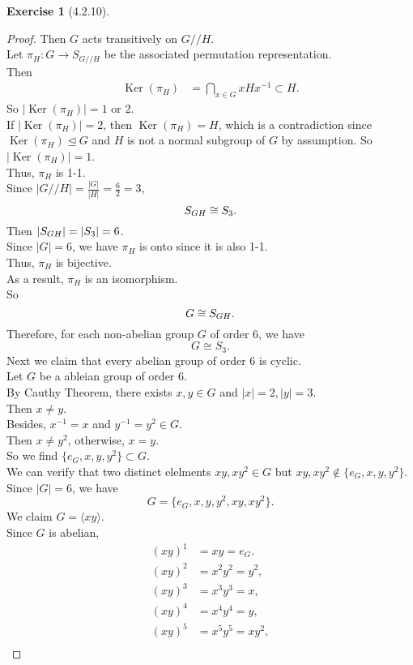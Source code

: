 \documentclass{amsart}
\renewcommand{\ker}{\operatorname{Ker}}
\theoremstyle{plain}
\theoremstyle{definition}
\newtheorem{exer}[lem]{Exercise}
\begin{document}
\begin{exer}[4.2.10]
\begin{proof}
Then $G$ acts transitively on $G//H$. \\
Let $\pi_H: G \to S_{G//H}$ be the associated permutation representation.\\
Then
\begin{align*}
	\ker(\pi_H) &= \bigcap_{x\in G}xHx^{-1} \subset  H.
\end{align*}
So $|\ker(\pi_H)| = 1$ or $2$.\\
If $|\ker(\pi_H)| =2$, then $\ker(\pi_H) = H$, which is a contradiction since $\ker(\pi_H) \unlhd G$ and $H$ is not a normal subgroup of $G$ by assumption.
So $|\ker(\pi_H)| = 1$.\\
Thus, $\pi_H$ is 1-1.\\
Since $\left|G//H\right| = \frac{|G|}{|H|} = \frac{6}{2} = 3$,\\
\[ S_{G\\H} \cong S_3. \]
Then $|S_{G\\H}| = |S_3| = 6$.\\
Since $|G| = 6$, we have $\pi_H$ is onto since it is also 1-1.\\
Thus, $\pi_H$ is bijective.\\
As a result, $\pi_H$ is an isomorphism.\\
So 
\[G \cong S_{G\\H}.\]
Therefore, for each non-abelian group $G$ of order 6, we have
\[G \cong S_3. \]
Next we claim that every abelian group of order 6 is cyclic.\\
Let $G$ be a ableian group of order 6.\\
By Cauthy Theorem, there exists $x,y \in G$ and $|x| = 2, |y|= 3$.\\
Then $x \neq y$.\\
Besides, $x^{-1} = x$ and $y^{-1} = y^2 \in G$.\\
Then $x \neq y^2$, otherwise, $x=y$.\\
So we find $\{e_G,x,y,y^2\} \subset G$.\\
We can verify that two distinct elelments $xy,xy^2 \in G$ but $xy,xy^2 \not\in \{e_G,x,y,y^2\}$.
Since $|G|=6$, we have
\[ G=\{e_G,x,y,y^2,xy,xy^2\}.\]
We claim $G=\langle xy \rangle$.\\
Since $G$ is abelian,
\begin{align*}
  (xy)^1 &= xy =e_G.\\
  (xy)^2 &=x^2y^2 =y^2,\\
  (xy)^3 &=x^3y^3 = x,\\
  (xy)^4 &=x^4y^4 = y,\\
  (xy)^5 &=x^5y^5 = xy^2,\\

\end{align*}
\end{proof}
\end{exer}
\end{document}
